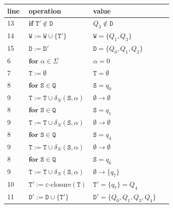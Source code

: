 \documentclass{article}
\begin{document}
\begin{minipage}[c]{0.59\textwidth}
\scriptsize
\setlength{\tabcolsep}{2pt}
\renewcommand{\arraystretch}{1.45}
\begin{tabular}{@{}p{0.13\linewidth}|p{0.39\linewidth}|p{}@{}}
\textbf{line} & \textbf{operation} & \textbf{value} \\
\hline
13 & \(\textbf{if }\mathtt{T}'\notin\mathtt{D}\) & \(Q_3\notin\mathtt{D}\) \\
14 & \(\mathtt{W} := \mathtt{W}\cup\{\mathtt{T}'\}\) & \(\mathtt{W}=\{Q_1,Q_3\}\) \\
15 & \(\mathtt{D} := \mathtt{D}'\) & \(\mathtt{D}=\{Q_0,Q_1,Q_3\}\) \\
6 & \(\textbf{for }\alpha\in\Sigma\) & \(\alpha=0\) \\
7 & \(\mathtt{T} := \emptyset\) & \(\mathtt{T}=\emptyset\) \\
8 & \(\textbf{for }\mathtt{S}\in\mathtt{Q}\) & \(\mathtt{S}=q_0\) \\
9 & \(\mathtt{T} := \mathtt{T}\cup\delta_N(\mathtt{S},\alpha)\) & \(\emptyset\to\emptyset\) \\
8 & \(\textbf{for }\mathtt{S}\in\mathtt{Q}\) & \(\mathtt{S}=q_1\) \\
9 & \(\mathtt{T} := \mathtt{T}\cup\delta_N(\mathtt{S},\alpha)\) & \(\emptyset\to\emptyset\) \\
8 & \(\textbf{for }\mathtt{S}\in\mathtt{Q}\) & \(\mathtt{S}=q_4\) \\
9 & \(\mathtt{T} := \mathtt{T}\cup\delta_N(\mathtt{S},\alpha)\) & \(\emptyset\to\emptyset\) \\
8 & \(\textbf{for }\mathtt{S}\in\mathtt{Q}\) & \(\mathtt{S}=q_6\) \\
9 & \(\mathtt{T} := \mathtt{T}\cup\delta_N(\mathtt{S},\alpha)\) & \(\emptyset\to\{q_7\}\) \\
10 & \(\mathtt{T}' := \varepsilon\mbox{-closure}(\mathtt{T})\) & \(\mathtt{T}'=\{q_7\}=Q_4\) \\
11 & \(\mathtt{D}' := \mathtt{D}\cup\{\mathtt{T}'\}\) & \(\mathtt{D}'=\{Q_0,Q_1,Q_3,Q_4\}\) \\
\end{tabular}
\end{minipage}\hfill%
\begin{minipage}[c]{0.39\textwidth}
\centering
{}
\end{minipage}
\end{document}
